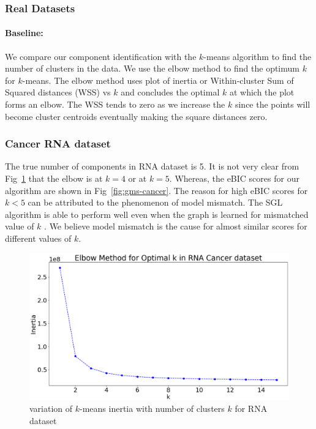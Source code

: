 \subsubsection{Real Datasets}
\paragraph{\textbf{Baseline:}} We compare our component identification with the $k$-means algorithm to find the number of clusters in the data. We use the elbow method to find the optimum $k$ for $k$-means. The elbow method uses plot of inertia or Within-cluster Sum of Squared distances (WSS) vs $k$ and concludes the optimal $k$ at which the plot forms an elbow. The WSS tends to zero as we increase the $k$ since the points will become cluster centroids eventually making the square distances zero.
\subsubsection{Cancer RNA dataset}
The true number of components in RNA dataset is 5. It is not very clear from Fig~\ref{fig:kmeans-cancer} that the elbow is at $k=4$ or at $k=5$. Whereas, the eBIC scores for our algorithm are shown in Fig~\ref{fig:gms-cancer}. The reason for high eBIC scores for $k<5$ can be attributed to the phenomenon of model mismatch. The SGL algorithm is able to perform well even when the graph is learned for mismatched value of $k$ \citep{kumar2020unified}. We believe model mismatch is the cause for almost similar scores for different values of $k$.
\begin{center}
	\begin{figure}[htpb]
		\includegraphics[scale=0.38]{Pictures/cancer_kmeans_800}
		\caption{variation of $k$-means inertia with number of clusters $k$ for RNA dataset}
		\label{fig:kmeans-cancer}
	\end{figure}
\end{center}

